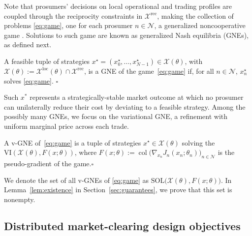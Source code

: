 \documentclass[final]{l4dc2026}
\begin{document}
Note that prosumers' decisions on local operational and trading profiles are coupled through the reciprocity constraints in $\mathcal{X}^{\mathrm{rec}}$, making the collection of problems \eqref{eq:game}, one for each prosumer $n\in \mathcal{N}$, a generalized noncooperative game \citep{facchinei2010generalized}. Solutions to such game are known as generalized Nash equilibria (GNEs), as defined next.
\begin{definition}[GNE]\label{def:gne}
A feasible tuple of strategies $x^\star = (x^\star_0, \ldots,x^\star_{N-1}) \in \mathcal{X}(\theta)$, with $\mathcal{X}(\theta):= \mathcal{X}^{\mathrm{\text{loc}}}(\theta) \cap \mathcal{X}^{\mathrm{rec}}$, is a GNE of the game~\eqref{eq:game} if, for all $n \in \mathcal{N}$, $x^\star_n$ solves \eqref{eq:game}.
{\hfill $\square$}
\end{definition}

Such $x^*$ represents a strategically-stable market outcome at which no prosumer can unilaterally reduce their cost by deviating to a feasible strategy.
Among the possibly many GNEs, we focus on the variational GNE, a refinement with uniform marginal price across each trade.
\begin{definition}[v-GNE]\label{def:vgne}
A v-GNE of~\eqref{eq:game} is a
tuple of strategies $x^\star \in \mathcal{X}(\theta)$ solving the
$\mathrm{VI}(\mathcal{X}(\theta), F(x;\theta))$,
where $F(x;\theta):= \operatorname{col}\big(\nabla_{x_n} J_n(x_n;\theta_n)\big)_{n \in \mathcal{N}}$
is the pseudo-gradient of the game.{\hfill $\square$}
\end{definition}

We denote the set of all v-GNEs of \eqref{eq:game} as
$ \mathrm{SOL}\big(\mathcal{X}(\theta),
  F(x;\theta)\big)
$. In Lemma~\ref{lem:existence} in Section~\ref{sec:guarantees}, we prove that this set is nonempty.

\subsection{Distributed market-clearing design objectives}
\label{sec:2b}
\end{document}
